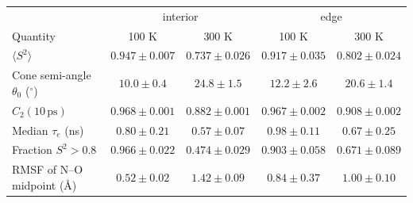 \begin{tabular}{lcccc}
\toprule
 & \multicolumn{2}{c}{interior} & \multicolumn{2}{c}{edge}\\
Quantity & 100 K & 300 K & 100 K & 300 K\\
\midrule
$\langle S^2\rangle$ & $0.947\pm0.007$ & $0.737\pm0.026$ & $0.917\pm0.035$ & $0.802\pm0.024$\\
Cone semi-angle $\theta_0$ ($^\circ$) & $10.0\pm0.4$ & $24.8\pm1.5$ & $12.2\pm2.6$ & $20.6\pm1.4$\\
$C_2(10\,\mathrm{ps})$ & $0.968\pm0.001$ & $0.882\pm0.001$ & $0.967\pm0.002$ & $0.908\pm0.002$\\
Median $\tau_e$ (ns) & $0.80\pm0.21$ & $0.57\pm0.07$ & $0.98\pm0.11$ & $0.67\pm0.25$\\
Fraction $S^2>0.8$ & $0.966\pm0.022$ & $0.474\pm0.029$ & $0.903\pm0.058$ & $0.671\pm0.089$\\
RMSF of N--O midpoint (\AA) & $0.52\pm0.02$ & $1.42\pm0.09$ & $0.84\pm0.37$ & $1.00\pm0.10$\\
\bottomrule
\end{tabular}
